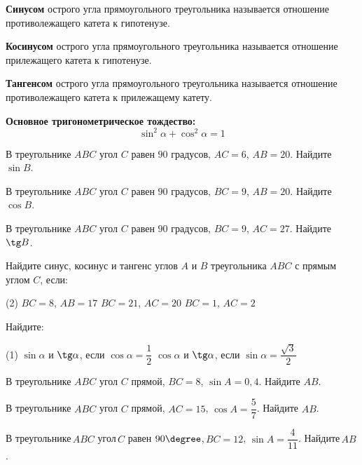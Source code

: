 \begin{class}[number=3]
		\begin{definit}
		\textbf{Синусом} острого угла прямоугольного треугольника называется отношение противолежащего катета к гипотенузе.
		\end{definit}
		\begin{definit}
		\textbf{Косинусом} острого угла прямоугольного треугольника называется отношение прилежащего катета к гипотенузе.
		\end{definit}
		\begin{definit}
		\textbf{Тангенсом} острого угла прямоугольного треугольника называется отношение противолежащего катета к прилежащему катету.
		\end{definit}
		\begin{definit}
		\textbf{Основное тригонометрическое тождество:} \[\sin^2\alpha+\cos^2\alpha=1\]
		\end{definit}
		\begin{listofex}
		\item В треугольнике \( ABC \) угол \( C \) равен \( 90 \) градусов, \( AC=6 \), \( AB=20 \). Найдите \( \sin B \).
		\item  В треугольнике \( ABC \) угол \( C \) равен \( 90 \) градусов, \( BC=9 \), \( AB=20 \). Найдите \( \cos B \).
		\item В треугольнике \( ABC \) угол \( C \) равен \( 90 \) градусов, \( BC=9 \), \( AC=27 \). Найдите \( \tg B \).
		\item Найдите синус, косинус и тангенс углов \( A \) и \( B \) треугольника \( ABC \) с прямым углом \( C \), если:
		\begin{tasks}(2)
			\task \( BC=8 \), \( AB=17 \)
			\task \( BC=21 \), \( AC=20 \)
			\task \( BC=1 \), \( AC=2 \)
		\end{tasks}
		\item Найдите:
		\begin{tasks}(1)
			\task \( \sin\alpha \) и \( \tg\alpha \), если \( \cos\alpha=\dfrac{1}{2} \)
			\task \( \cos\alpha \) и \( \tg\alpha \), если \( \sin\alpha=\dfrac{\sqrt{3}}{2} \)
		\end{tasks}
		\item В треугольнике \( ABC \) угол \( C \) прямой, \( BC=8 \), \( \sin A=0,4 \). Найдите \( AB \).
		\item В треугольнике \( ABC \) угол \( C \) прямой, \( AC=15 \), \( \cos A=\dfrac{5}{7} \). Найдите \( AB \).
		\item В треугольнике \( ABC \) угол \( C \) равен \( 90\degree \), \( BC=12 \), \( \sin A=\dfrac{4}{11} \). Найдите \( AB \).

\end{listofex}
\end{class}
